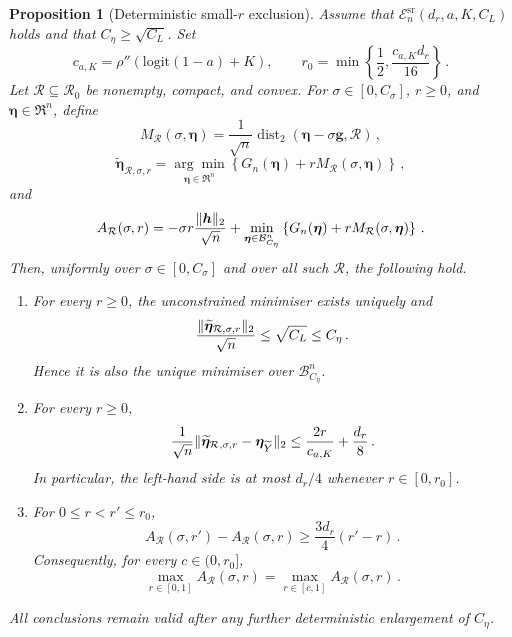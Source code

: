 \documentclass[10pt,a4paper]{amsart}
\makeatletter
\newtheorem{proposition}{Proposition}
\def\Ytil{\widetilde{Y}}
\def\bEtaYtil{\bb{\eta}_{\Ytil}}
\newcommand*{\bb}{\boldsymbol}
\def\bg{\bb{g}}
\def\bh{\bb{h}}
\newcommand{\logit}[1]{\ensuremath{\textrm{logit}(#1)}}
\newcommand{\vnorm}[1]{%
	\ensuremath{%
		\if@display
		\left\| #1 \right\|
		\else
		\| #1 \|
		\fi
	}%
}
\makeatother
\begin{document}
\begin{proposition}[Deterministic small-$r$ exclusion]
\label{prop:small_r_exclusion}
Assume that $\mathcal E_n^{\mathrm{sr}}(d_r,a,K,C_L)$ holds and that
$C_\eta\geq\sqrt{C_L}$. Set
\begin{equation}
\label{eq:small_r_radius}
	c_{a,K}
	=
	\rho''(\logit{1-a}+K),
	\qquad
	r_0
	=
	\min\left\{
		\frac12,
		\frac{c_{a,K} d_r}{16}
	\right\}\,.
\end{equation}
Let $\mathcal R\subseteq\mathcal R_0$ be nonempty, compact, and convex. For
$\sigma\in[0,C_\sigma]$, $r\geq0$, and $\bb\eta\in\Re^n$, define
$$
	M_{\mathcal R}(\sigma,\bb\eta)
	=
	\frac1{\sqrt n}
	\operatorname{dist}_2
	\left(
		\bb\eta-\sigma\bg,
		\mathcal R
	\right)\,,
$$
$$
	\widetilde{\bb\eta}_{\mathcal R,\sigma,r}
	=
	\underset{\bb\eta\in\Re^n}{\arg\min}
	\left\{
		G_n(\bb\eta)
		+
		rM_{\mathcal R}(\sigma,\bb\eta)
	\right\}\,,
$$
and
$$
	A_{\mathcal R}(\sigma,r)
	=
	-\sigma r\frac{\vnorm{\bh}_2}{\sqrt n}
	+
	\underset{\bb\eta\in\mathcal B^n_{C_\eta}}{\min}
	\left\{
		G_n(\bb\eta)
		+
		rM_{\mathcal R}(\sigma,\bb\eta)
	\right\}\,.
$$
Then, uniformly over $\sigma\in[0,C_\sigma]$ and over all such
$\mathcal R$, the following hold.
\begin{enumerate}[label=(\roman*)]
	\item For every $r\geq0$, the unconstrained minimiser exists uniquely and
	$$
		\frac{
			\vnorm{\widetilde{\bb\eta}_{\mathcal R,\sigma,r}}_2
		}{
			\sqrt n
		}
		\leq
		\sqrt{C_L}
		\leq
		C_\eta\,.
	$$
	Hence it is also the unique minimiser over
	$\mathcal B^n_{C_\eta}$.

	\item For every $r\geq0$,
	\begin{equation}
	\label{eq:small_r_displacement}
		\frac1{\sqrt n}
		\vnorm{
			\widetilde{\bb\eta}_{\mathcal R,\sigma,r}
			-
			\bEtaYtil
		}_2
		\leq
		\frac{2r}{c_{a,K}}
		+
		\frac{d_r}{8}\,.
	\end{equation}
	In particular, the left-hand side is at most $d_r/4$ whenever
	$r\in[0,r_0]$.

	\item For $0\leq r<r'\leq r_0$,
	\begin{equation}
	\label{eq:small_r_profile_increment}
		A_{\mathcal R}(\sigma,r')
		-
		A_{\mathcal R}(\sigma,r)
		\geq
		\frac{3d_r}{4}(r'-r)\,.
	\end{equation}
	Consequently, for every $c\in(0,r_0]$,
	\begin{equation}
	\label{eq:small_r_profile_exclusion}
		\underset{r\in[0,1]}{\max}
		A_{\mathcal R}(\sigma,r)
		=
		\underset{r\in[c,1]}{\max}
		A_{\mathcal R}(\sigma,r)\,.
	\end{equation}
\end{enumerate}
All conclusions remain valid after any further deterministic enlargement of
$C_\eta$.
\end{proposition}
\end{document}
